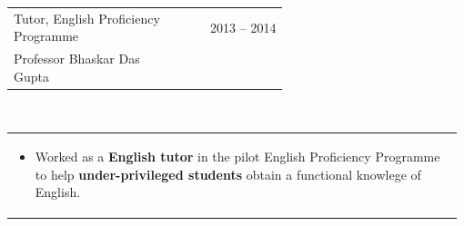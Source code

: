 \documentclass[a4paper]{article} %
\newcommand{\verticalspacing}{-0.25cm}
\newcommand{\headspace}{-0.3cm}
\newcommand{\bulletspace}{0.7cm}
\newcommand{\projectheadspacing}{6.9cm}
\newcommand{\cproject}[5]{%
    \begin{tabular}{p{0.60\linewidth}r}
        \textcolor{NavyBlue}{\small #2} & \multicolumn{1}{m{ \projectheadspacing{} }}{\raggedleft \small {\textsc{#1}}}\\
        \small {#3} & \small {#4}
    \end{tabular}\\
    \begin{tabular}{p{0.98\linewidth}}
    \vspace{-0.3cm}
        \small{#5}
    \end{tabular}
    \vspace{\verticalspacing{}}
}
\newcommand{\gitproject}[3]{%
    \begin{tabular}{p{0.60\linewidth}r}
        \textcolor{NavyBlue}{\small #2} & \multicolumn{1}{m{ \projectheadspacing{} }}{\raggedleft #1}\\
    \end{tabular}\\
    \begin{tabular}{p{0.98\linewidth}}
        \vspace{\headspace{}}
        \small{#3}
    \end{tabular}
    \vspace{\verticalspacing{}}
    \vspace{-0.2cm} %
}
\newcommand{\skill}[2]{%
    \begin{tabular}{p{0.60\linewidth}r}
        \small {#2} & \multicolumn{1}{m{ \projectheadspacing{} }}{\raggedleft \textsc{\small #1}}\\
    \end{tabular}
    \vspace{\verticalspacing{}}
}
\begin{document}
\cproject
    {2013 -- 2014}
    {Tutor, English Proficiency Programme}
    {Professor Bhaskar Das Gupta}
    {}
    {%
        \begin{itemize}[leftmargin=\bulletspace{}]
            \item Worked as a \textbf{English tutor} in the pilot English Proficiency Programme to help
                \textbf{under-privileged students} obtain a functional knowlege of English.
        \end{itemize}
    }



%
%
%
\end{document}
